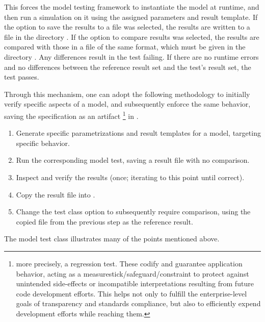 This forces the model testing framework to instantiate the model at runtime, and then run 
a simulation on it using the assigned parameters and result template.
If the option to save the results to a file was selected, the results are written to 
a file in the directory \filename{}.
If the option to compare results was selected, the results are compared with those 
in a file of the same format, which must be given in the directory \filename{}. 
Any differences result in the test failing. If there are no runtime errors and no 
differences between the reference result set and the test's result set, the test passes.

Through this mechanism, one can adopt the following methodology to initially verify 
specific aspects of a model, and subsequently enforce the same behavior, saving
the specification as an artifact \footnote{more precisely, a regression test. These
codify and guarantee application behavior, acting as a measurestick/safeguard/constraint 
to protect against unintended side-effects or incompatible interpretations 
resulting from future code development efforts. This helps not only to fulfill the 
enterprise-level goals of transparency and standards compliance, but also to efficiently
expend development efforts while reaching them.} in \RA.
\begin{enumerate}\tightitemize{0pt}
	\item Generate specific parametrizations and result templates for a model, 
	      targeting specific behavior.
	\item Run the corresponding model test, saving a result file with no comparison.
	\item Inspect and verify the results (once; iterating to this point until correct).
	\item Copy the result file into .
	\item Change the test class option to subsequently require comparison,
	      using the copied file from the previous step as the reference result.
\end{enumerate}

The model test class  
illustrates many of the points mentioned above.

